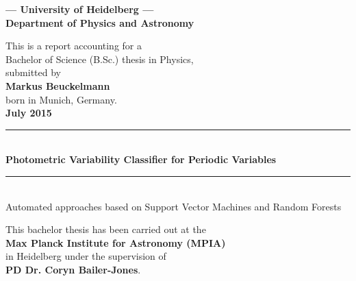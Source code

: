 \begin{titlepage}
\begin{center}

\Large\textbf{--- University of Heidelberg ---\\Department of Physics and Astronomy}

\vspace{12cm}

\normalsize
This is a report accounting for a\\
Bachelor of Science (B.Sc.) thesis in Physics,\\
submitted by\\
\vspace{0.2cm}
\Large\textbf{Markus Beuckelmann}\\
\normalsize
\vspace{0.2cm}
born in Munich, Germany.\\
\vspace{0.5cm}
\Large\textbf{July 2015}
\normalsize

\newpage

\vspace*{6cm}


\rule{0.90\linewidth}{0.6pt}\\
\Huge\textbf{Photometric Variability Classifier for Periodic Variables}
\rule{0.90\linewidth}{0.6pt}\\
\vspace{1cm}
\large{Automated approaches based on Support Vector Machines and Random Forests}

\vfill

\normalsize
This bachelor thesis has been carried out at the\\
\textbf{Max Planck Institute for Astronomy (MPIA)}\\ in Heidelberg
under the supervision of\\
\textbf{PD Dr. Coryn Bailer-Jones}.


\end{center}

\end{titlepage}

